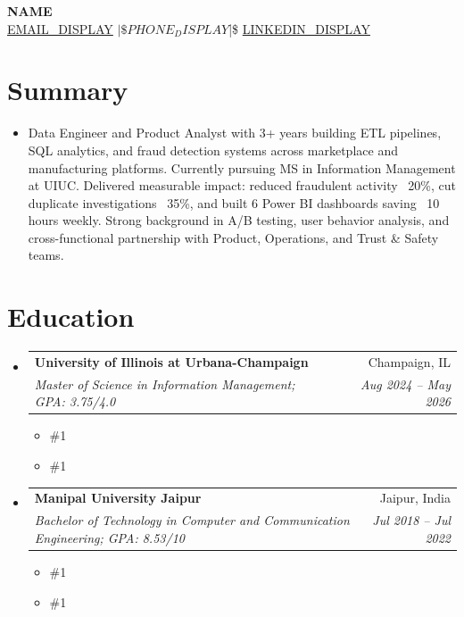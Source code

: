 \documentclass[letterpaper,11pt]{article}
\makeatletter
\newcommand{\resumeSubheading}[4]{
  \vspace{0pt}\item
    \begin{tabular*}{\textwidth}{l@{\extracolsep{\fill}}r}
      \textbf{#1} & #2 \\
      \textit{#3} & \textit{#4} \\ 
    \end{tabular*}\vspace{-6pt}
}
\newcommand{\resumeEducationCoursework}[1]{
  \vspace{-9pt} 
  \begin{itemize}[leftmargin=0pt, label={}]
    \item {\#1}
  \end{itemize}
}
\newcommand{\resumeEducationCertifications}[1]{
  \vspace{-15pt} 
  \begin{itemize}[leftmargin=0pt, label={}]
    \item {\#1}
  \end{itemize}
}
\newcommand{\resumeSubHeadingListStart}{\begin{itemize}[leftmargin=0pt,label={},itemsep=-2pt]}
\newcommand{\resumeSubHeadingListEnd}{\end{itemize}}
\makeatother
\begin{document}
\justifying

\begin{center}
    \textbf{\LARGE {{NAME}}} \\ \vspace{5pt}
    \href{mailto:{{EMAIL_URL}}}{{EMAIL_DISPLAY}} $|\$ {{PHONE_DISPLAY}} $|\$ \href{%
      {{LINKEDIN_URL}}%
    }{%
      {{LINKEDIN_DISPLAY}}%
    }
\end{center}

\section{Summary}
\begin{itemize}[leftmargin=0pt, label={}]
  \item { Data Engineer and Product Analyst with 3+ years building ETL pipelines, SQL analytics, and fraud detection systems across marketplace and manufacturing platforms. Currently pursuing MS in Information Management at UIUC. Delivered measurable impact: reduced fraudulent activity ~20\%, cut duplicate investigations ~35\%, and built 6 Power BI dashboards saving ~10 hours weekly. Strong background in A/B testing, user behavior analysis, and cross-functional partnership with Product, Operations, and Trust \& Safety teams. }
\end{itemize}

\section{Education}
  \resumeSubHeadingListStart
    \resumeSubheading
      {University of Illinois at Urbana-Champaign}{Champaign, IL}
      {Master of Science in Information Management; GPA: 3.75/4.0}{Aug 2024 -- May 2026}
      \resumeEducationCoursework{\textbf{Relevant Coursework:} Applied Machine Learning, Data Warehousing and Business Intelligence, Data Mining, Information Modeling, Data Visualization, Data and Statistical Models}
      \resumeEducationCertifications{\textbf{Certifications:} Getting Started with Microsoft Azure, Cloud Computing, The Complete Prompt Engineering for AI Bootcamp}

    \resumeSubheading
      {Manipal University Jaipur}{Jaipur, India}
      {Bachelor of Technology in Computer and Communication Engineering; GPA: 8.53/10}{Jul 2018 -- Jul 2022}
      \resumeEducationCoursework{\textbf{Relevant Coursework:} Data Structures and Algorithms, Relational Database Management Systems, Operating Systems, Computer Networks}
      \resumeEducationCertifications{\textbf{Certifications:} Certified Ethical Hacker (EC Council), Google Project Management Specialization}
  \resumeSubHeadingListEnd
\end{document}
